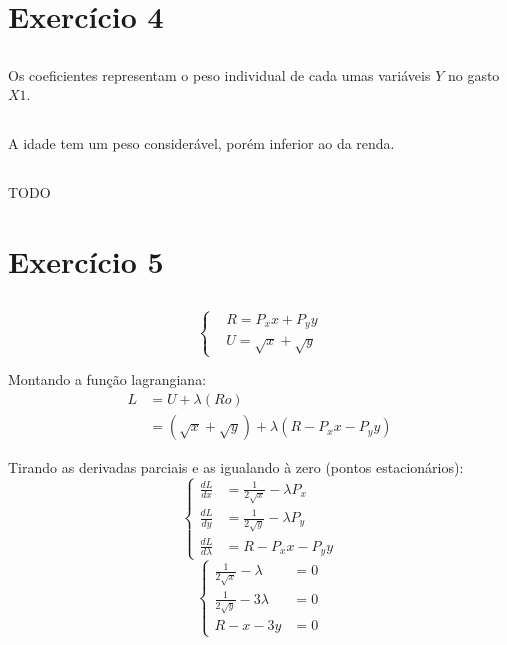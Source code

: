 \documentclass{article}
\begin{document}
\section{Exercício 4}
\subsection{}
Os coeficientes representam o peso individual de cada umas variáveis \(Y\) no
gasto \(X1\).
\subsection{}
A idade tem um peso considerável, porém inferior ao da renda.
\subsection{}
TODO


\section{Exercício 5}
\subsection{}

\[
	\left\{
	\begin{aligned}
		 & R = P_x x + P_y y       \\
		 & U = \sqrt{x} + \sqrt{y}
	\end{aligned}
	\right.
\]

Montando a função lagrangiana:
\[
	\begin{aligned}
		L & = U + \lambda(Ro)                                    \\
		  & = (\sqrt{x} + \sqrt{y}) + \lambda(R - P_x x - P_y y)
	\end{aligned}
\]

Tirando as derivadas parciais e as igualando à zero (pontos estacionários):
\[
	\left\{
	\begin{aligned}
		\frac{dL}{dx}       & = \frac{1}{2\sqrt{x}} - \lambda P_x \\
		\frac{dL}{dy}       & = \frac{1}{2\sqrt{y}} - \lambda P_y \\
		\frac{dL}{d\lambda} & =  R - P_x x - P_y y
	\end{aligned}
	\right.
\]
\[
	\left\{
	\begin{aligned}
		\frac{1}{2\sqrt{x}} - \lambda  & = 0 \\
		\frac{1}{2\sqrt{y}} - 3\lambda & = 0 \\
		R - x - 3y                     & = 0
	\end{aligned}
	\right.
\]
\end{document}
